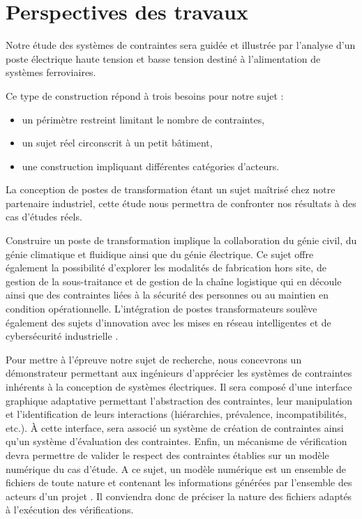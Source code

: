\documentclass[a4paper,12pt]{article}
\begin{document}
\section{Perspectives des travaux}
\label{sec:orgfe54244}
Notre étude des systèmes de contraintes sera guidée et illustrée par l’analyse d’un poste électrique haute tension et basse tension destiné à l'alimentation de systèmes ferroviaires. 

Ce type de construction répond à trois besoins pour notre sujet : 
\begin{itemize}
\item un périmètre restreint limitant le nombre de contraintes,
\item un sujet réel circonscrit à un petit bâtiment,
\item une construction impliquant différentes catégories d’acteurs.
\end{itemize}

La conception de postes de transformation étant un sujet maîtrisé chez notre partenaire industriel, cette étude nous permettra de confronter nos résultats à des cas d’études réels. 

Construire un poste de transformation implique la collaboration du génie civil, du génie climatique et fluidique ainsi que du génie électrique. Ce sujet offre également la possibilité d’explorer les modalités de fabrication hors site, de gestion de la sous-traitance et de gestion de la chaîne logistique qui en découle ainsi que des contraintes liées à la sécurité des personnes ou au maintien en condition opérationnelle. L’intégration de postes transformateurs soulève également des sujets d'innovation avec les mises en réseau intelligentes et de cybersécurité industrielle \autocite{flausCybersecuriteInstallationsIndustrielles2018a}.

Pour mettre à l’épreuve notre sujet de recherche, nous concevrons un démonstrateur permettant aux ingénieurs d’apprécier les systèmes de contraintes inhérents à la conception de systèmes électriques. Il sera composé d’une interface graphique adaptative permettant l’abstraction des contraintes, leur manipulation et l’identification de leurs interactions (hiérarchies, prévalence, incompatibilités, etc.). À cette interface, sera associé un système de création de contraintes ainsi qu’un système d’évaluation des contraintes. Enfin, un mécanisme de vérification devra permettre de valider le respect des contraintes établies sur un modèle numérique du cas d’étude. A ce sujet, un modèle numérique est un ensemble de fichiers de toute nature et contenant les informations générées par l’ensemble des acteurs d’un projet \autocite{OrganisationNumerisationInformations2018a}. Il conviendra donc de préciser la nature des fichiers adaptés à l'exécution des vérifications.
\end{document}
